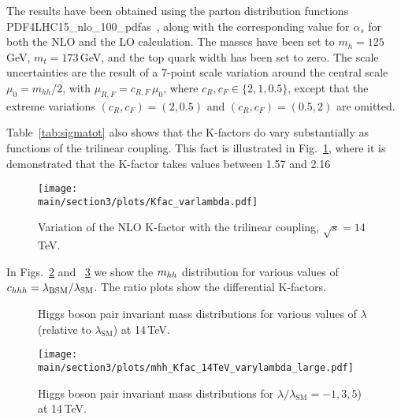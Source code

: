 The results have been obtained using the parton distribution functions PDF4LHC15\_nlo\_100\_pdfas~\cite{Butterworth:2015oua,CT14,MMHT14,NNPDF},
along with the corresponding value for $\alpha_s$ for both the NLO and
the LO calculation.
The masses have been set to $m_h=125$\,GeV, $m_t=173$\,GeV,
and the top quark width has been set to zero. 
The scale uncertainties are the result of a 7-point scale variation around the central scale $\mu_0 = m_{hh}/2$,
with $\mu_{R,F}=c_{R,F}\,\mu_0$, where 
$c_R,c_F\in \{2,1,0.5\}$, except that the extreme variations $(c_R,c_F)=(2,0.5)$ and $(c_R,c_F)=(0.5,2)$
are omitted. 

Table~\ref{tab:sigmatot} also shows that the K-factors do vary substantially as functions of the trilinear coupling.
This fact is illustrated in Fig.~\ref{fig:Kfacvariation}, where it is demonstrated that the K-factor takes values between 1.57 and 2.16

\begin{figure}[htb]
  \centering
    \texttt{[image: \\main/section3/plots/Kfac\_varlambda.pdf]}
\caption{Variation of the NLO K-factor with the trilinear coupling, $\sqrt{s}=14$\,TeV.}
\label{fig:Kfacvariation}
\end{figure}



In Figs.~\ref{fig:lambda_small} and ~\ref{fig:lambda_large} we show the $m_{hh}$ distribution for various values of $c_{hhh}=\lambda_{\mathrm{BSM}}/\lambda_{\mathrm{SM}}$. 
The ratio plots show the differential K-factors. 

\begin{figure}[htb]
  \centering
 \caption{Higgs boson pair invariant mass distributions for various values of $\lambda$ (relative to $\lambda_{\mathrm{SM}}$)  at 14\,TeV.}
\label{fig:lambda_small}
\end{figure}
%
\begin{figure}[htb]
  \centering
    \texttt{[image: \\main/section3/plots/mhh\_Kfac\_14TeV\_varylambda\_large.pdf]}
\caption{Higgs boson pair invariant mass distributions for $\lambda/\lambda_{\mathrm{SM}}=-1,3,5$)  at 14\,TeV.}
\label{fig:lambda_large}
\end{figure}

